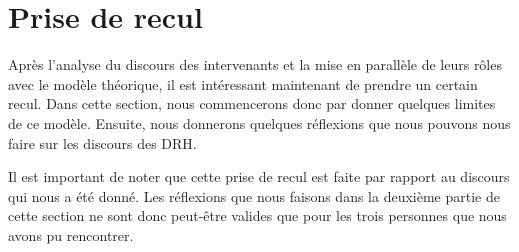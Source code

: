 \section{Prise de recul}

Après l'analyse du discours des intervenants et la mise en parallèle de leurs rôles avec le modèle théorique, il est intéressant maintenant de prendre un certain recul. Dans cette section, nous commencerons donc par donner quelques limites de ce modèle. Ensuite, nous donnerons quelques  réflexions que nous pouvons nous faire sur les discours des DRH.\newline

Il est important de noter que cette prise de recul est faite par rapport au discours qui nous a été donné. Les réflexions que nous faisons dans la deuxième partie de cette section ne sont donc peut-être valides que pour les trois personnes que nous avons pu rencontrer. \newline
